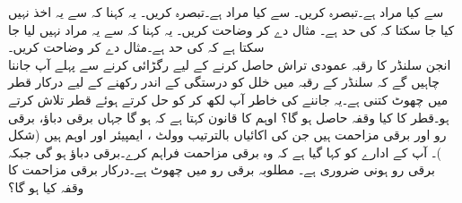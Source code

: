  سے کیا مراد ہے۔تبصرہ کریں۔
 سے کیا مراد ہے۔تبصرہ کریں۔
یہ کہنا کہ  سے یہ اخذ نہیں کیا جا سکتا  کہ  کی حد  ہے۔ مثال دے کر وضاحت کریں۔
یہ کہنا کہ  سے یہ مراد نہیں لیا جا سکتا ہے کہ  کی حد  ہے۔مثال دے کر وضاحت کریں۔
\\
انجن سلنڈر  کا رقبہ عمودی تراش  حاصل کرنے کے لیے رگڑائی کرنے سے پہلے آپ جاننا چاہیں گے کہ سلنڈر کے رقبہ میں خلل کو  درستگی کے اندر رکھنے کے لیے درکار  قطر  میں چھوٹ کتنی ہے۔یہ جاننے کی خاطر آپ  لکھ کر  کو حل کرتے ہوئے قطر  تلاش کرتے ہو۔قطر کا کیا وقفہ حاصل ہو گا؟
اوہم کا قانون کہتا ہے کہ  ہو گا جہاں  برقی دباؤ،  برقی رو اور  برقی مزاحمت ہیں جن کی اکائیاں بالترتیب وولٹ ، ایمپیئر  اور اوہم  ہیں (شکل )۔ آپ کے ادارے کو کہا گیا ہے کہ وہ برقی مزاحمت فراہم کرے۔برقی دباؤ  ہو گی جبکہ برقی رو  ہونی ضروری ہے۔ مطلوبہ برقی رو  میں چھوٹ  ہے۔درکار برقی مزاحمت کا وقفہ کیا ہو گا؟
